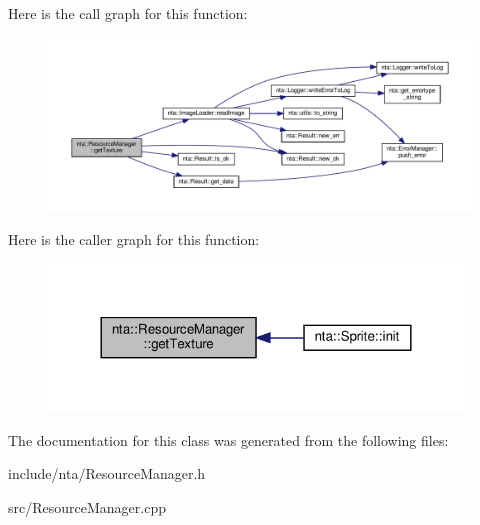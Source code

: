 Here is the call graph for this function\+:
\nopagebreak
\begin{figure}[H]
\begin{center}
\leavevmode
\includegraphics[width=350pt]{d5/d87/classnta_1_1ResourceManager_a60911bfeef0df3802c6ef03cc10fb5c1_cgraph}
\end{center}
\end{figure}
Here is the caller graph for this function\+:\nopagebreak
\begin{figure}[H]
\begin{center}
\leavevmode
\includegraphics[width=312pt]{d5/d87/classnta_1_1ResourceManager_a60911bfeef0df3802c6ef03cc10fb5c1_icgraph}
\end{center}
\end{figure}


The documentation for this class was generated from the following files\+:\begin{DoxyCompactItemize}
\item 
include/nta/Resource\+Manager.\+h\item 
src/Resource\+Manager.\+cpp\end{DoxyCompactItemize}
